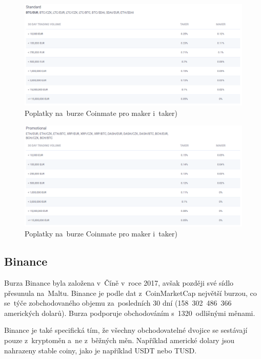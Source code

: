 \documentclass[thesis=B,czech]{FITthesis}[2019/03/21]
\begin{document}
\begin{figure}\centering
	\includegraphics[width=1\textwidth]{images/coinmate_standard.PNG}
	\caption{Poplatky na~burze Coinmate pro maker i~taker) \cite{coinmate_fees}}\label{coinmate_standard}
\end{figure}
\begin{figure}\centering
	\includegraphics[width=1\textwidth]{images/coinmate_promotional.PNG}
	\caption{Poplatky na~burze Coinmate pro maker i~taker) \cite{coinmate_fees}}\label{coinmate_promotional}
\end{figure}
\subsection{Binance}
Burza Binance byla založena v~Číně v~roce 2017, avšak později své sídlo přesunula na~Maltu. Binance je podle dat z~CoinMarketCap největší burzou, co se~týče zobchodovaného objemu za~posledních 30 dní (158~302~486~366 amerických dolarů). \cite{coinmarketcap} Burza podporuje obchodováním s~1320~odlišnými měnami.

Binance je také specifická tím, že všechny obchodovatelné dvojice se  \linebreak sestávají pouze z~kryptoměn a~ne z~běžných měn. Například americké dolary jsou nahrazeny stable coiny, jako je například USDT nebo TUSD. 
\end{document}
